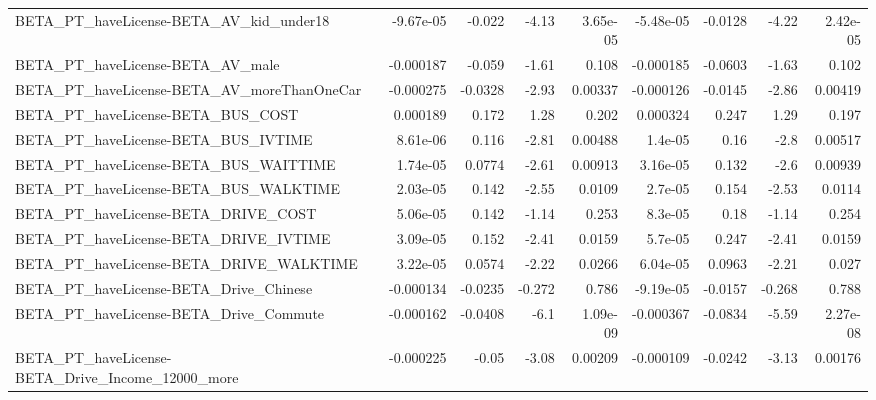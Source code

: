 \begin{tabular}{lrrrrrrrr}
BETA\_PT\_haveLicense-BETA\_AV\_kid\_under18            &   -9.67e-05 &       -0.022 &     -4.13 & 3.65e-05 &  -5.48e-05 &     -0.0128 &        -4.22 &      2.42e-05 \\
BETA\_PT\_haveLicense-BETA\_AV\_male                   &   -0.000187 &       -0.059 &     -1.61 &    0.108 &  -0.000185 &     -0.0603 &        -1.63 &         0.102 \\
BETA\_PT\_haveLicense-BETA\_AV\_moreThanOneCar         &   -0.000275 &      -0.0328 &     -2.93 &  0.00337 &  -0.000126 &     -0.0145 &        -2.86 &       0.00419 \\
BETA\_PT\_haveLicense-BETA\_BUS\_COST                  &    0.000189 &        0.172 &      1.28 &    0.202 &   0.000324 &       0.247 &         1.29 &         0.197 \\
BETA\_PT\_haveLicense-BETA\_BUS\_IVTIME                &    8.61e-06 &        0.116 &     -2.81 &  0.00488 &    1.4e-05 &        0.16 &         -2.8 &       0.00517 \\
BETA\_PT\_haveLicense-BETA\_BUS\_WAITTIME              &    1.74e-05 &       0.0774 &     -2.61 &  0.00913 &   3.16e-05 &       0.132 &         -2.6 &       0.00939 \\
BETA\_PT\_haveLicense-BETA\_BUS\_WALKTIME              &    2.03e-05 &        0.142 &     -2.55 &   0.0109 &    2.7e-05 &       0.154 &        -2.53 &        0.0114 \\
BETA\_PT\_haveLicense-BETA\_DRIVE\_COST                &    5.06e-05 &        0.142 &     -1.14 &    0.253 &    8.3e-05 &        0.18 &        -1.14 &         0.254 \\
BETA\_PT\_haveLicense-BETA\_DRIVE\_IVTIME              &    3.09e-05 &        0.152 &     -2.41 &   0.0159 &    5.7e-05 &       0.247 &        -2.41 &        0.0159 \\
BETA\_PT\_haveLicense-BETA\_DRIVE\_WALKTIME            &    3.22e-05 &       0.0574 &     -2.22 &   0.0266 &   6.04e-05 &      0.0963 &        -2.21 &         0.027 \\
BETA\_PT\_haveLicense-BETA\_Drive\_Chinese             &   -0.000134 &      -0.0235 &    -0.272 &    0.786 &  -9.19e-05 &     -0.0157 &       -0.268 &         0.788 \\
BETA\_PT\_haveLicense-BETA\_Drive\_Commute             &   -0.000162 &      -0.0408 &      -6.1 & 1.09e-09 &  -0.000367 &     -0.0834 &        -5.59 &      2.27e-08 \\
BETA\_PT\_haveLicense-BETA\_Drive\_Income\_12000\_more   &   -0.000225 &        -0.05 &     -3.08 &  0.00209 &  -0.000109 &     -0.0242 &        -3.13 &       0.00176 \\

\end{tabular}
